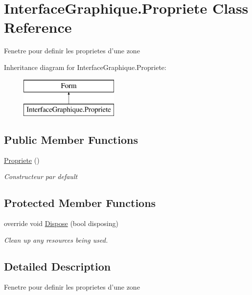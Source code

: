 \hypertarget{class_interface_graphique_1_1_propriete}{\section{Interface\-Graphique.\-Propriete Class Reference}
\label{class_interface_graphique_1_1_propriete}
}


Fenetre pour definir les proprietes d'une zone  


Inheritance diagram for Interface\-Graphique.\-Propriete\-:\begin{figure}[H]
\begin{center}
\leavevmode
\includegraphics[height=2.000000cm]{class_interface_graphique_1_1_propriete}
\end{center}
\end{figure}
\subsection*{Public Member Functions}
\begin{DoxyCompactItemize}
\item 
\hyperlink{class_interface_graphique_1_1_propriete_a4c798febd268607e46100156b85613cf}{Propriete} ()
\begin{DoxyCompactList}\small\item\em Constructeur par default \end{DoxyCompactList}\end{DoxyCompactItemize}
\subsection*{Protected Member Functions}
\begin{DoxyCompactItemize}
\item 
override void \hyperlink{class_interface_graphique_1_1_propriete_ad9f4fd75a75f8fc047ce46b11590be12}{Dispose} (bool disposing)
\begin{DoxyCompactList}\small\item\em Clean up any resources being used. \end{DoxyCompactList}\end{DoxyCompactItemize}


\subsection{Detailed Description}
Fenetre pour definir les proprietes d'une zone 




